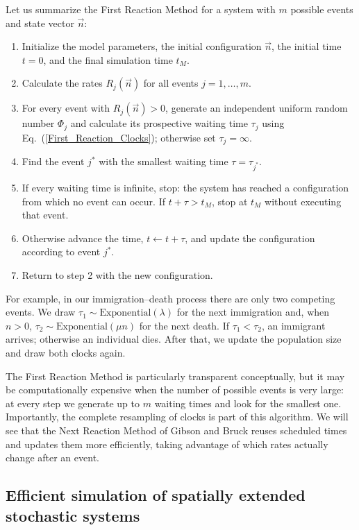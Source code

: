 Let us summarize the First Reaction Method for a system with $m$ possible events and state vector $\vec n$:
\begin{enumerate}
 \item Initialize the model parameters, the initial configuration $\vec n$, the initial time $t=0$, and the final simulation time $t_M$.
 \item Calculate the rates $R_j(\vec n)$ for all events $j=1,\ldots,m$.
 \item For every event with $R_j(\vec n)>0$, generate an independent uniform random number $\Phi_j$ and calculate its prospective waiting time $\tau_j$ using Eq.~(\ref{First_Reaction_Clocks}); otherwise set $\tau_j=\infty$.
 \item Find the event $j^*$ with the smallest waiting time $\tau=\tau_{j^*}$.
 \item If every waiting time is infinite, stop: the system has reached a configuration from which no event can occur. If $t+\tau>t_M$, stop at $t_M$ without executing that event.
 \item Otherwise advance the time, $t\leftarrow t+\tau$, and update the configuration according to event $j^*$.
 \item Return to step 2 with the new configuration.
\end{enumerate}

For example, in our immigration--death process there are only two competing events. We draw $\tau_1\sim\mathrm{Exponential}(\lambda)$ for the next immigration and, when $n>0$, $\tau_2\sim\mathrm{Exponential}(\mu n)$ for the next death. If $\tau_1<\tau_2$, an immigrant arrives; otherwise an individual dies. After that, we update the population size and draw both clocks again.
\smallskip

The First Reaction Method is particularly transparent conceptually, but it may be computationally expensive when the number of possible events is very large: at every step we generate up to $m$ waiting times and look for the smallest one. Importantly, the complete resampling of clocks is part of this algorithm. We will see that the Next Reaction Method of Gibson and Bruck \citep{Gibson00}reuses scheduled times and updates them more efficiently, taking advantage of which rates actually change after an event.

\subsection{Efficient simulation of spatially extended stochastic systems} 

